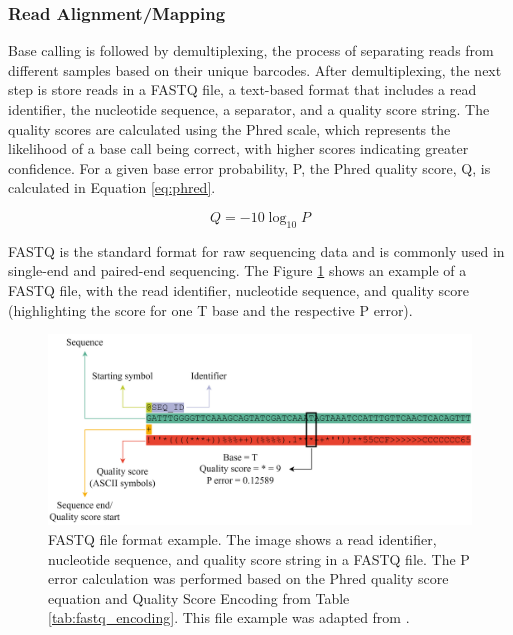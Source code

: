 \subsubsection{\textbf{Read Alignment/Mapping}} \label{subsubsec:ngs_alignment}

Base calling is followed by demultiplexing, the process of separating reads from different samples based on their unique barcodes. After demultiplexing, the next step is store reads in a FASTQ file, a text-based format that includes a read identifier, the nucleotide sequence, a separator, and a quality score string. The quality scores are calculated using the Phred scale, which represents the likelihood of a base call being correct, with higher scores indicating greater confidence. For a given base error probability, P, the Phred quality score, Q, is calculated in Equation \ref{eq:phred}.

\begin{equation}\label{eq:phred}
    Q = -10 \log_{10} P
\end{equation}

FASTQ is the standard format for raw sequencing data and is commonly used in single-end and paired-end sequencing. \cite{Larson2023} The Figure \ref{fig:fastq} shows an example of a FASTQ file, with the read identifier, nucleotide sequence, and quality score (highlighting the score for one T base and the respective P error).

\begin{figure}[H]
    \centering
    \includegraphics[width=1\textwidth]{figs/fastq.png}
    \caption{FASTQ file format example. The image shows a read identifier, nucleotide sequence, and quality score string in a FASTQ file. The P error calculation was performed based on the Phred quality score equation and Quality Score Encoding from Table \ref{tab:fastq_encoding}. This file example was adapted from \cite{Wikipedia2024}.} 
    \label{fig:fastq}
\end{figure}

